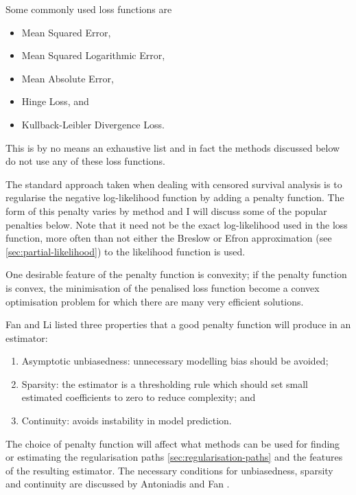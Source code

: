 Some commonly used loss functions are 

\begin{itemize}
    \item Mean Squared Error,
    \item Mean Squared Logarithmic Error,
    \item Mean Absolute Error,
    \item Hinge Loss, and
    \item Kullback-Leibler Divergence Loss.
\end{itemize}

This is by no means an exhaustive list and in fact the methods discussed below do not use any of these loss functions.

The standard approach taken when dealing with censored survival analysis is to regularise the negative log-likelihood function by adding a penalty function. The form of this penalty varies by method and I will discuss some of the popular penalties below. Note that it need not be the exact log-likelihood used in the loss function, more often than not either the Breslow or Efron approximation (see \cref{sec:partial-likelihood}) to the likelihood function is used.

One desirable feature of the penalty function is convexity; if the penalty function is convex, the minimisation of the penalised loss function become a convex optimisation problem for which there are many very efficient solutions.

Fan and Li  listed three properties that a good penalty function will produce in an estimator:

\begin{enumerate}
    \item Asymptotic unbiasedness: unnecessary modelling bias should be avoided;
    \item Sparsity: the estimator is a thresholding rule which should set small estimated coefficients to zero to reduce complexity; and
    \item Continuity: avoids instability in model prediction.
\end{enumerate}

The choice of penalty function will affect what methods can be used for finding or estimating the regularisation paths \cref{sec:regularisation-paths} and the features of the resulting estimator. The necessary conditions for unbiasedness, sparsity and continuity are discussed by Antoniadis and Fan .

